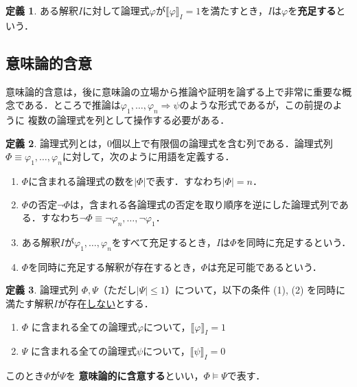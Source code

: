 \documentclass[uplatex,a4paper,dvipdfmx]{jsarticle}
\newcommand{\semvalue}[1]{\llbracket {#1} \rrbracket}
\theoremstyle{definition}
\newtheorem{dfn}{定義}
\begin{document}
            \begin{dfn}
                ある解釈$I$に対して論理式$\varphi$が$\semvalue{\varphi}_I = 1$を満たすとき，$I$は$\varphi$を\textbf{充足する}という．
            \end{dfn}

        \subsection{意味論的含意}
            意味論的含意は，後に意味論の立場から推論や証明を論ずる上で非常に重要な概念である．ところで推論は$\varphi_1, \ldots, \varphi_n \Longrightarrow \psi$のような形式であるが，この前提のように
            複数の論理式を列として操作する必要がある．
            \begin{dfn}\label{dfn:sequence}
                論理式列とは，0個以上で有限個の論理式を含む列である．論理式列$\Phi \equiv \varphi_1, \ldots ,\varphi_n$に対して，次のように用語を定義する．
                \begin{enumerate}
                    \item $\Phi$に含まれる論理式の数を$|\Phi|$で表す．すなわち$|\Phi| = n$．
                    \item $\Phi$の否定$\lnot \Phi$は，含まれる各論理式の否定を取り順序を逆にした論理式列である．すなわち$\lnot \Phi \equiv \lnot\varphi_n, \ldots, \lnot\varphi_1$．
                    \item ある解釈$I$が$\varphi_1, \ldots, \varphi_n$をすべて充足するとき，$I$は$\Phi$を同時に充足するという．
                    \item $\Phi$を同時に充足する解釈が存在するとき，$\Phi$は充足可能であるという．
                \end{enumerate}
            \end{dfn}
            \begin{dfn}\label{dfn:semanticv}
                論理式列 $\Phi, \Psi$（ただし$|\Psi| \le 1$）について，以下の条件 (1), (2) を同時に満たす解釈$I$が存在\underline{しない}とする．
                \begin{enumerate}
                    \item $\Phi$ に含まれる全ての論理式$\varphi$について，$\semvalue{\varphi}_I = 1$
                    \item $\Psi$ に含まれる全ての論理式$\psi$について，$\semvalue{\psi}_I = 0$
                \end{enumerate}
                このとき$\Phi$が$\Psi$を \textbf{意味論的に含意する}といい，$\Phi \vDash \Psi$で表す．
            \end{dfn}
\end{document}
